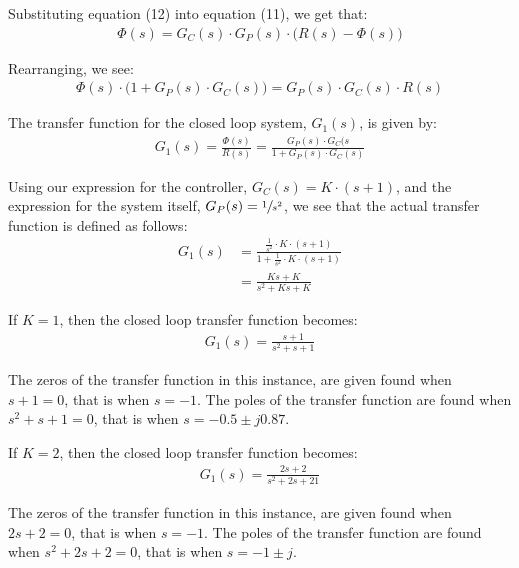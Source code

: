 \documentclass{article}
\begin{document}
	Substituting equation (12) into equation (11), we get that:
	\begin{align*}
		\Phi(s) = G_C(s) \cdot G_P(s) \cdot \bigg( R(s) - \Phi(s) \bigg)
	\end{align*}
	
	Rearranging, we see:
	\begin{align*}
		\Phi(s) \cdot \bigg( 1 + G_P(s) \cdot G_C(s) \bigg) = G_P(s) \cdot G_C(s) \cdot R(s)
	\end{align*}
	
	The transfer function for the closed loop system, $G_1(s)$, is given by:
	\begin{align}
		G_1(s) = \frac{\Phi(s)}{R(s)} = \frac{G_P(s) \cdot G_C(s}{1 + G_P(s) \cdot G_C(s)}
	\end{align}
	
	Using our expression for the controller, $G_C(s) = K \cdot (s + 1)$, and the expression for the system itself, $G_P(s) = \sfrac{1}{s^2}$, we see that the actual transfer function is defined as follows:
	\begin{align}
		G_1(s) 	&= \frac{\frac{1}{s^2} \cdot K \cdot (s + 1)}{1 + \frac{1}{s^2} \cdot K \cdot (s + 1)} \nonumber \\
				&= \frac{Ks + K}{s^2 + Ks + K}
	\end{align}
	
	If $K = 1$, then the closed loop transfer function becomes:
	\begin{align*}
		G_1(s) = \frac{s + 1}{s^2 + s + 1}
	\end{align*}
	
	The zeros of the transfer function in this instance, are given found when $s + 1 = 0$, that is when $s = -1$. The poles of the transfer function are found when $s^2 + s + 1 = 0$, that is when $s = -0.5 \pm j0.87$.
	
	If $K = 2$, then the closed loop transfer function becomes:
	\begin{align*}
		G_1(s) = \frac{2s + 2}{s^2 + 2s + 21}
	\end{align*}
	
	The zeros of the transfer function in this instance, are given found when $2s + 2 = 0$, that is when $s = -1$. The poles of the transfer function are found when $s^2 + 2s + 2 = 0$, that is when $s = -1 \pm j$.\\
	
\end{document}
